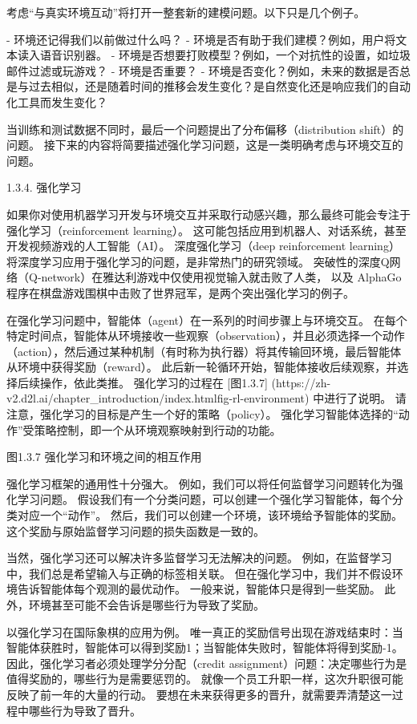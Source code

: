 考虑“与真实环境互动”将打开一整套新的建模问题。以下只是几个例子。

- 环境还记得我们以前做过什么吗？
- 环境是否有助于我们建模？例如，用户将文本读入语音识别器。
- 环境是否想要打败模型？例如，一个对抗性的设置，如垃圾邮件过滤或玩游戏？
- 环境是否重要？
- 环境是否变化？例如，未来的数据是否总是与过去相似，还是随着时间的推移会发生变化？是自然变化还是响应我们的自动化工具而发生变化？

当训练和测试数据不同时，最后一个问题提出了分布偏移（distribution shift）的问题。 接下来的内容将简要描述强化学习问题，这是一类明确考虑与环境交互的问题。

 1.3.4. 强化学习

如果你对使用机器学习开发与环境交互并采取行动感兴趣，那么最终可能会专注于强化学习（reinforcement learning）。 这可能包括应用到机器人、对话系统，甚至开发视频游戏的人工智能（AI）。 深度强化学习（deep reinforcement learning）将深度学习应用于强化学习的问题，是非常热门的研究领域。 突破性的深度Q网络（Q-network）在雅达利游戏中仅使用视觉输入就击败了人类， 以及 AlphaGo 程序在棋盘游戏围棋中击败了世界冠军，是两个突出强化学习的例子。

在强化学习问题中，智能体（agent）在一系列的时间步骤上与环境交互。 在每个特定时间点，智能体从环境接收一些观察（observation），并且必须选择一个动作（action），然后通过某种机制（有时称为执行器）将其传输回环境，最后智能体从环境中获得奖励（reward）。 此后新一轮循环开始，智能体接收后续观察，并选择后续操作，依此类推。 强化学习的过程在 [图1.3.7]
(https://zh-v2.d2l.ai/chapter\_introduction/index.htmlfig-rl-environment) 
中进行了说明。 请注意，强化学习的目标是产生一个好的策略（policy）。 强化学习智能体选择的“动作”受策略控制，即一个从环境观察映射到行动的功能。


图1.3.7 强化学习和环境之间的相互作用

强化学习框架的通用性十分强大。 例如，我们可以将任何监督学习问题转化为强化学习问题。 假设我们有一个分类问题，可以创建一个强化学习智能体，每个分类对应一个“动作”。 然后，我们可以创建一个环境，该环境给予智能体的奖励。 这个奖励与原始监督学习问题的损失函数是一致的。

当然，强化学习还可以解决许多监督学习无法解决的问题。 例如，在监督学习中，我们总是希望输入与正确的标签相关联。 但在强化学习中，我们并不假设环境告诉智能体每个观测的最优动作。 一般来说，智能体只是得到一些奖励。 此外，环境甚至可能不会告诉是哪些行为导致了奖励。

以强化学习在国际象棋的应用为例。 唯一真正的奖励信号出现在游戏结束时：当智能体获胜时，智能体可以得到奖励1；当智能体失败时，智能体将得到奖励-1。 因此，强化学习者必须处理学分分配（credit assignment）问题：决定哪些行为是值得奖励的，哪些行为是需要惩罚的。 就像一个员工升职一样，这次升职很可能反映了前一年的大量的行动。 要想在未来获得更多的晋升，就需要弄清楚这一过程中哪些行为导致了晋升。

